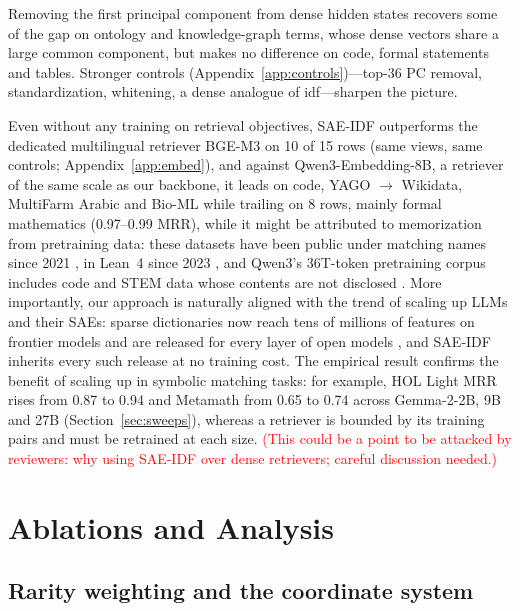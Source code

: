 \documentclass[11pt]{article}
\newcommand{\method}{SAE\mbox{-}IDF\xspace}
\begin{document}
Removing the first principal component from dense hidden states recovers some of the gap on ontology and knowledge-graph terms, whose dense vectors share a large common component, but makes no difference on code, formal statements and tables.
Stronger controls (Appendix~\ref{app:controls})---top-36 PC removal, standardization, whitening, a dense analogue of idf---sharpen the picture.

Even without any training on retrieval objectives, \method outperforms the dedicated multilingual retriever BGE-M3 on 10 of 15 rows (same views, same controls; Appendix~\ref{app:embed}), and against Qwen3-Embedding-8B, a retriever of the same scale as our backbone, it leads on code, YAGO $\to$ Wikidata, MultiFarm Arabic and Bio-ML while trailing on 8 rows, mainly formal mathematics (0.97--0.99 MRR), while it might be attributed to memorization from pretraining data: these datasets have been public under matching names since 2021 \citep{zheng2022minif2f}, in Lean~4 since 2023 \citep{yang2023minif2flean4}, and Qwen3's 36T-token pretraining corpus includes code and STEM data whose contents are not disclosed \citep{yang2025qwen3}.
More importantly, our approach is naturally aligned with the trend of scaling up LLMs and their SAEs: sparse dictionaries now reach tens of millions of features on frontier models \citep{templeton2024scaling, gao2025scaling} and are released for every layer of open models \citep{lieberum2024gemmascope, he2024llamascope}, and \method inherits every such release at no training cost.
The empirical result confirms the benefit of scaling up in symbolic matching tasks: for example, HOL Light MRR rises from 0.87 to 0.94 and Metamath from 0.65 to 0.74 across Gemma-2-2B, 9B and 27B (Section~\ref{sec:sweeps}), whereas a retriever is bounded by its training pairs and must be retrained at each size. \textcolor{red}{(This could be a point to be attacked by reviewers: why using SAE-IDF over dense retrievers; careful discussion needed.)}

\section{Ablations and Analysis}
\label{sec:analysis}

\subsection{Rarity weighting and the coordinate system}
\label{sec:ablation}

\begin{table}[t]
  \centering\scriptsize
  \setlength{\tabcolsep}{2.5pt}
  
  \caption{Ablating the two ingredients of \method on the main-table tasks. \emph{Random\,+\,idf}: a random dictionary of the same width and sparsity with the same rarity weighting; \emph{SAE-unweighted}: the learned features without it. Bold: best per row. $^\dagger$As in Table~\ref{tab:main}.}
  \label{tab:ablationmain}
\end{table}
\end{document}
